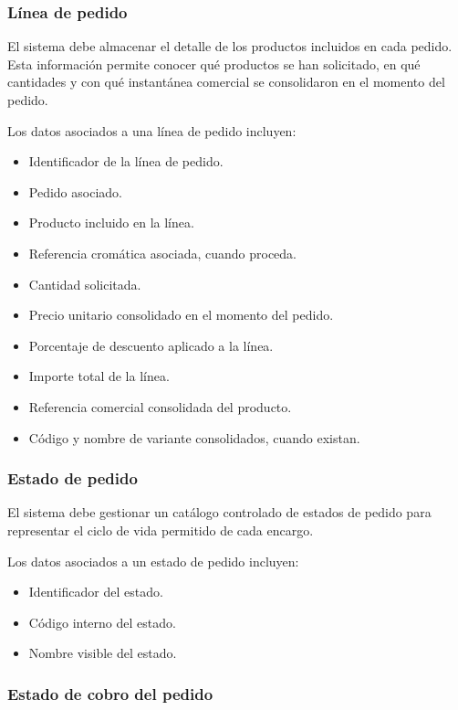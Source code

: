 \subsubsection*{Línea de pedido}

El sistema debe almacenar el detalle de los productos incluidos en cada pedido. Esta información permite conocer qué productos se han solicitado, en qué cantidades y con qué instantánea comercial se consolidaron en el momento del pedido.

Los datos asociados a una línea de pedido incluyen:

\begin{itemize}
    \item Identificador de la línea de pedido.
    \item Pedido asociado.
    \item Producto incluido en la línea.
    \item Referencia cromática asociada, cuando proceda.
    \item Cantidad solicitada.
    \item Precio unitario consolidado en el momento del pedido.
    \item Porcentaje de descuento aplicado a la línea.
    \item Importe total de la línea.
    \item Referencia comercial consolidada del producto.
    \item Código y nombre de variante consolidados, cuando existan.
\end{itemize}

\subsubsection*{Estado de pedido}

El sistema debe gestionar un catálogo controlado de estados de pedido para representar el ciclo de vida permitido de cada encargo.

Los datos asociados a un estado de pedido incluyen:

\begin{itemize}
    \item Identificador del estado.
    \item Código interno del estado.
    \item Nombre visible del estado.
\end{itemize}

\subsubsection*{Estado de cobro del pedido}

